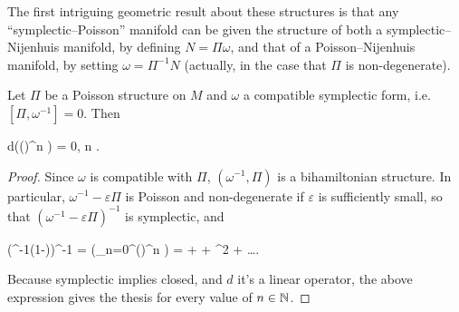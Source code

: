 \documentclass[main.tex]{subfiles}
\begin{document}
The first intriguing geometric result about these structures is that any ``symplectic--Poisson'' manifold can be given the structure of both a symplectic--Nijenhuis manifold, by defining $N=\Pi\omega$, and that of a Poisson--Nijenhuis manifold, by setting $\omega = \Pi^{-1}N$ (actually, in the case that $\Pi$ is non-degenerate).

\begin{lemma}
\label{lemma:powers_of_comp_are_closed}
	Let $\Pi$ be a Poisson structure on $M$ and $\omega$ a compatible symplectic form, i.e. $[\Pi, \omega^{-1}]=0$. Then\footnotemark
	\begin{eqalign}
		d((\omega\Pi)^n \omega) = 0, \quad \forall n \in \N.
	\end{eqalign}
\end{lemma}
\begin{proof}
	Since $\omega$ is compatible with $\Pi$, $(\omega^{-1}, \Pi)$ is a bihamiltonian structure. In particular, $\omega^{-1}-\varepsilon \Pi$ is Poisson and non-degenerate if $\varepsilon$ is sufficiently small, so that $(\omega^{-1}-\varepsilon \Pi)^{-1}$ is symplectic, and
	\begin{eqalign}
		(\omega^{-1}(1-\varepsilon \omega \Pi))^{-1} = \left(\sum_{n=0}^\infty (\varepsilon \omega \Pi)^n \right) \omega = \omega + \varepsilon \omega \Pi \omega + \varepsilon^2 \omega \Pi \omega \Pi \omega + \ldots.
	\end{eqalign}
	Because symplectic implies closed, and $d$ it's a linear operator, the above expression gives the thesis for every value of $n \in \mathbb{N}$.
\end{proof}
\end{document}
